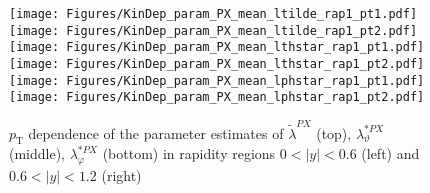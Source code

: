 \documentclass[12pt]{article}
\newcommand{\pT}{p_\mathrm{T}}
\newcommand{\absy}{\left |  y \right |}
\newcommand{\lamtildePX}{\tilde{\lambda}^{\scriptscriptstyle PX}}
\newcommand{\lamthstarPX}{\lambda^{* \scriptscriptstyle PX}_\vartheta}
\newcommand{\lamphstarPX}{\lambda^{* \scriptscriptstyle PX}_\varphi}
\begin{document}
\begin{figure}[htbp]
\centering
\texttt{[image: Figures/KinDep\_param\_PX\_mean\_ltilde\_rap1\_pt1.pdf]}
\texttt{[image: Figures/KinDep\_param\_PX\_mean\_ltilde\_rap1\_pt2.pdf]}
\texttt{[image: Figures/KinDep\_param\_PX\_mean\_lthstar\_rap1\_pt1.pdf]}
\texttt{[image: Figures/KinDep\_param\_PX\_mean\_lthstar\_rap1\_pt2.pdf]}
\texttt{[image: Figures/KinDep\_param\_PX\_mean\_lphstar\_rap1\_pt1.pdf]}
\texttt{[image: Figures/KinDep\_param\_PX\_mean\_lphstar\_rap1\_pt2.pdf]}
\caption{$\pT$ dependence of the parameter estimates of $\lamtildePX$ (top),
$\lamthstarPX$ (middle), $\lamphstarPX$ (bottom) in rapidity regions $0<\absy<0.6$ (left) and $0.6<\absy<1.2$ (right)}
\end{figure}
\clearpage
\end{document}
